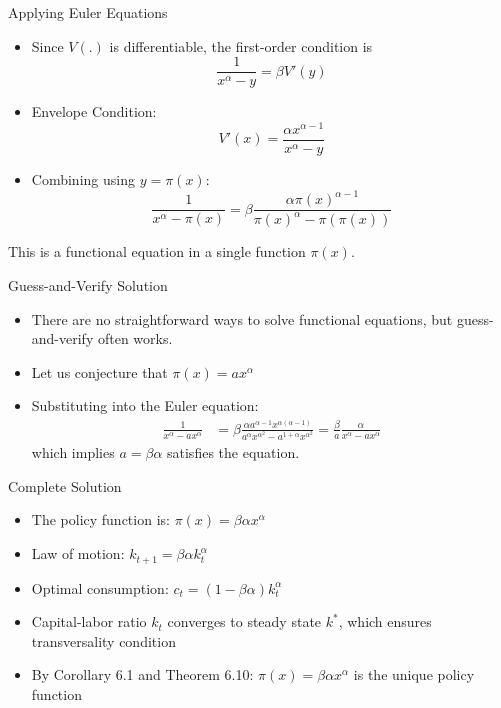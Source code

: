 \documentclass[9pt,aspectratio=169]{beamer}
\begin{document}
\begin{frame}{Applying Euler Equations}
    \begin{itemize}
        \item Since $V(.)$ is differentiable, the first-order condition is
        \begin{equation*}
            \frac{1}{x^{\alpha} - y} = \beta V'(y)
        \end{equation*}
        \item Envelope Condition:
        \begin{equation*}
            V'(x) = \frac{\alpha x^{\alpha-1}}{x^{\alpha} - y}
        \end{equation*}
        \item Combining using $y = \pi(x)$:
        \begin{equation*}
            \frac{1}{x^{\alpha} - \pi(x)} = \beta \frac{\alpha
              \pi(x)^{\alpha-1}}{\pi(x)^{\alpha} - \pi(\pi(x))}
        \end{equation*}
    \end{itemize}
    This is a functional equation in a single function $\pi(x)$.
\end{frame}

\begin{frame}{Guess-and-Verify Solution}
    \begin{itemize}
        \item There are no straightforward ways to solve functional
        equations, but guess-and-verify often works.
        \item Let us conjecture that $\pi(x) = ax^{\alpha}$
        \item Substituting into the Euler equation:
        \begin{align*}
            \frac{1}{x^{\alpha} - ax^{\alpha}} &= \beta \frac{\alpha
              a^{\alpha-1} x^{\alpha(\alpha-1)}}{a^{\alpha} x^{\alpha^2} -
              a^{1+\alpha} x^{\alpha^2}} = \frac{\beta}{a}
            \frac{\alpha}{x^{\alpha} - ax^{\alpha}}
        \end{align*}
        which implies $a = \beta\alpha$ satisfies the equation.
    \end{itemize}
\end{frame}

\begin{frame}{Complete Solution}

\begin{itemize}
    \item The policy function is: $\pi(x) = \beta\alpha x^{\alpha}$
    \item Law of motion: $k_{t+1} = \beta\alpha k_t^{\alpha}$
    \item Optimal consumption: $c_t = (1-\beta\alpha)k_t^{\alpha}$
    \item Capital-labor ratio $k_t$ converges to steady state $k^*$, which
    ensures transversality condition
    \item By Corollary 6.1 and Theorem 6.10: $\pi(x) = \beta\alpha
    x^{\alpha}$ is the unique policy function
\end{itemize}
\end{frame}
\end{document}
